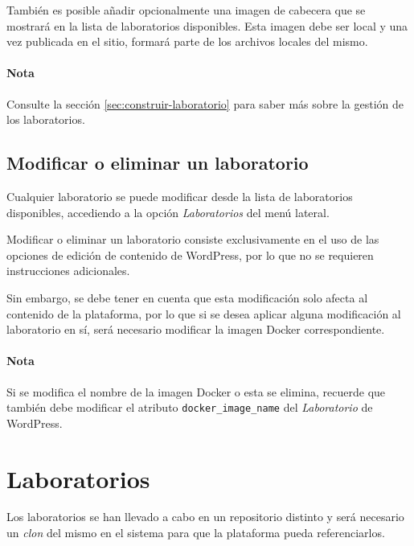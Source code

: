 \begin{appendices}
                También es posible añadir opcionalmente una imagen de cabecera que se mostrará en la lista de laboratorios disponibles. Esta imagen debe ser local y una vez publicada en el sitio, formará parte de los archivos locales del mismo.

                \paragraph{Nota}
                
                    Consulte la sección \ref{sec:construir-laboratorio} para saber más sobre la gestión de los laboratorios.

            \subsection{Modificar o eliminar un laboratorio}

                Cualquier laboratorio se puede modificar desde la lista de laboratorios disponibles, accediendo a la opción \textit{Laboratorios} del menú lateral.

                Modificar o eliminar un laboratorio consiste exclusivamente en el uso de las opciones de edición de contenido de WordPress, por lo que no se requieren instrucciones adicionales.

                Sin embargo, se debe tener en cuenta que esta modificación solo afecta al contenido de la plataforma, por lo que si se desea aplicar alguna modificación al laboratorio en sí, será necesario modificar la imagen Docker correspondiente.

                \paragraph{Nota}

                    Si se modifica el nombre de la imagen Docker o esta se elimina, recuerde que también debe modificar el atributo \texttt{docker\_image\_name} del \textit{Laboratorio} de WordPress.

                \newpage


        \section{Laboratorios}

            Los laboratorios se han llevado a cabo en un repositorio distinto y será necesario un \textit{clon} del mismo en el sistema para que la plataforma pueda referenciarlos.


\end{appendices}
